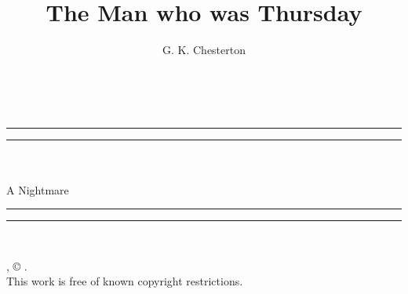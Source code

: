 \documentclass{book}
\date{}
\title{The Man who was Thursday}
\author{G. K. Chesterton}
\begin{document}
\thispagestyle{empty}
\begin{center}
	{\Huge \@title   \\[5mm]}
\end{center}
\newpage
\thispagestyle{empty}
\cleardoublepage
\begin{center}
	\thispagestyle{empty}
	\vspace*{\baselineskip}
	\rule{\textwidth}{1.6pt}\vspace*{-\baselineskip}\vspace*{2pt}
	\rule{\textwidth}{0.4pt}\\[\baselineskip]
	{\Huge\scshape \@title   \\[5mm]}
	{\Large A Nightmare}
	\rule{\textwidth}{0.4pt}\vspace*{-\baselineskip}\vspace{3.2pt}
	\rule{\textwidth}{1.6pt}\\[\baselineskip]
	\vspace*{4\baselineskip}
	{\Large \@author}
	\vfill
\end{center}
\pagebreak
\newpage
\thispagestyle{empty}
\null\vfill
\noindent
\begin{center}
	{\emph{\@title}, © \@author.\\[5mm]}
	{This work is free of known copyright restrictions.\\[5mm]}
\end{center}
\pagebreak
\newpage
\setcounter{tocdepth}{0}
\setcounter{secnumdepth}{0}
\end{document}
